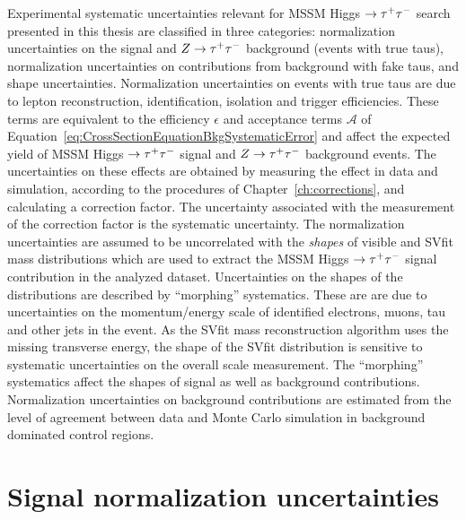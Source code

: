 Experimental systematic uncertainties relevant for MSSM Higgs $\to \tau^+\tau^-$ search
presented in this thesis are classified in three categories: normalization
uncertainties on the signal and $Z\to\tau^+\tau^-$ background (events with true taus),
normalization uncertainties on contributions from background with fake taus, and
shape uncertainties.  Normalization uncertainties on events with true taus are
due to lepton reconstruction, identification, isolation and trigger
efficiencies.  These terms are equivalent to the efficiency $\epsilon$ and
acceptance terms $\mathcal{A}$ of
Equation~\ref{eq:CrossSectionEquationBkgSystematicError} and affect the expected
yield of MSSM Higgs $\to \tau^+\tau^-$ signal and $Z \to \tau^+\tau^-$ background events.  The
uncertainties on these effects are obtained by measuring the effect in data and
simulation, according to the procedures of Chapter~\ref{ch:corrections}, and
calculating a correction factor.  The uncertainty associated with the
measurement of the correction factor is the systematic uncertainty.  The
normalization uncertainties are assumed to be uncorrelated with the
\emph{shapes} of visible and SVfit mass distributions which are
used to extract the MSSM Higgs $\to \tau^+\tau^-$ signal contribution in the analyzed
dataset.  Uncertainties on the shapes of the distributions are described by
``morphing'' systematics.  These are are due to uncertainties on the
momentum/energy scale of identified electrons, muons, tau and other jets in the
event.  As the SVfit mass reconstruction algorithm uses the missing transverse
energy, the shape of the SVfit distribution is sensitive to systematic
uncertainties on the overall scale \MET measurement.  The ``morphing''
systematics affect the shapes of signal as well as background contributions.
Normalization uncertainties on background contributions are estimated from the
level of agreement between data and Monte Carlo simulation in background
dominated control regions.

\section{Signal normalization uncertainties}

